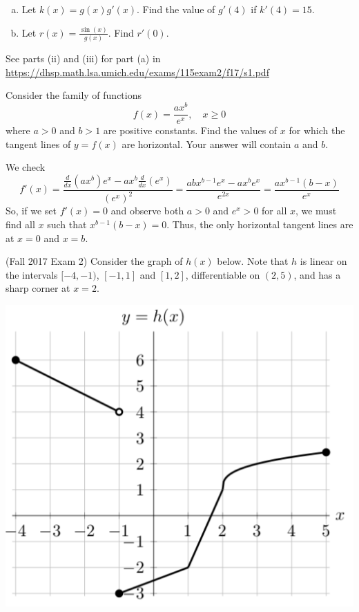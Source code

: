 \documentclass[11pt]{exam}
\newcommand{\ddx}{\frac{d}{dx}}
\begin{document}
\begin{questions}
\begin{figure}[h]
	\end{figure}	
	\begin{enumerate}[(a)]
		\item Let $k(x) = g(x)g'(x)$. Find the value of $g'(4)$ if $k'(4)=15$.
		\item Let $r(x) = \frac{\sin(x)}{g(x)}$. Find $r'(0)$.
	\end{enumerate}
        \begin{solution}
          See parts (ii) and (iii) for part (a) in\\ \href{https://dhsp.math.lsa.umich.edu/exams/115exam2/f17/s1.pdf}{https://dhsp.math.lsa.umich.edu/exams/115exam2/f17/s1.pdf}
        \end{solution}
\question Consider the family of functions
\[
f(x) = \frac{ax^b}{e^x}, \quad x \geqslant 0
\]
where $a>0$ and $b>1$ are positive constants. Find the values of $x$ for which the tangent lines of $y = f(x)$ are horizontal. Your answer will contain $a$ and $b$.
\begin{solution}
  We check \[
    f'(x) = \frac{\ddx(ax^b)e^x-ax^b\ddx(e^x)}{(e^x)^2} =
    \frac{abx^{b-1}e^x-ax^be^x}{e^{2x}} = \frac{ax^{b-1}(b-x)}{e^x}
  \]
  So, if we set \(f'(x) = 0\) and observe both \(a>0\) and \(e^x > 0\)
  for all \(x\), we must find all \(x\) such that \(x^{b-1}(b-x) = 0\). Thus,
  the only horizontal tangent lines are at \(x=0\) and \(x=b\).
\end{solution}
\question (Fall 2017 Exam 2) Consider the graph of $h(x)$ below. Note that \(h\) is linear on the intervals $[-4,-1)$, $[-1,1]$ and $[1,2]$, differentiable on $(2, 5)$, and has a sharp corner at $x = 2$.
\begin{center}
  \includegraphics[scale=0.33]{Figures/Exam2Fall2017Problem4}

\end{center}
\end{questions}
\end{document}
